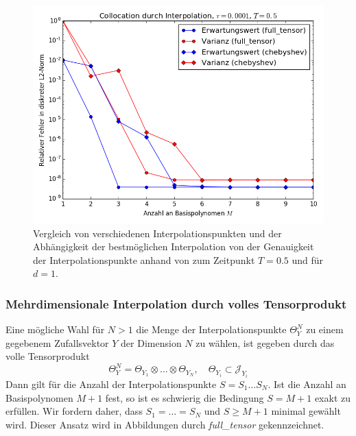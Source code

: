 \begin{mathbsp}
\begin{figure}[!htb]
\endminipage
{}
  \includegraphics[width=\linewidth]{Figures/collocation_mi_trial1_tau0001.png}
\endminipage
\caption{Vergleich von verschiedenen Interpolationspunkten und der Abhängigkeit der bestmöglichen Interpolation von der Genauigkeit der Interpolationspunkte anhand von  zum Zeitpunkt $T=0.5$ und für $d=1$.}
\label{fig:Kollokation_trial1}
\end{figure}
\end{mathbsp}
\subsubsection*{Mehrdimensionale Interpolation durch volles Tensorprodukt}
Eine mögliche Wahl für $N>1$ die Menge der Interpolationspunkte $\Theta_Y^N$ zu einem gegebenem Zufallsvektor $Y$ der Dimension $N$ zu wählen, ist gegeben durch das volle Tensorprodukt
\[\Theta_Y^N=\Theta_{Y_1}\otimes \dots \otimes \Theta_{Y_N},\quad \Theta_{Y_i}\subset \mathcal{J}_{Y_i}\]
Dann gilt für die Anzahl der Interpolationspunkte $S=S_1 \dots S_N$. Ist die Anzahl an Basispolynomen $M+1$ fest, so ist es schwierig die Bedingung $S=M+1$ exakt zu erfüllen. Wir fordern daher, dass $S_1=\dots=S_N$ und $S\ge M+1$ minimal gewählt wird. Dieser Ansatz wird in Abbildungen durch \textit{full\_tensor} gekennzeichnet.
